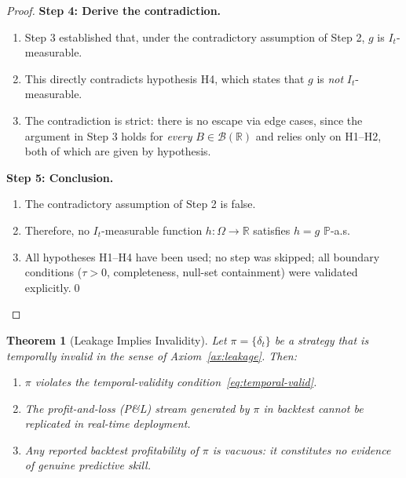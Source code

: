\documentclass[12pt,openany]{book}
\newcommand{\calI}{\mathcal{I}}
\numberwithin{equation}{chapter}
\theoremstyle{plain}
\newtheorem{theorem}{Theorem}[chapter]
\theoremstyle{definition}
\theoremstyle{remark}
\numberwithin{equation}{chapter}
\theoremstyle{plain}
\def\calI{I}%
\begin{document}
\begin{proof}
\medskip
\noindent\textbf{Step 4: Derive the contradiction.}
\begin{enumerate}
  \item Step 3 established that, under the contradictory
        assumption of Step 2, $g$ is $\calI_t$-measurable.
  \item This directly contradicts hypothesis H4, which states
        that $g$ is \emph{not} $\calI_t$-measurable.
  \item The contradiction is strict: there is no escape via
        edge cases, since the argument in Step 3 holds for
        \emph{every} $B \in \mathcal{B}(\mathbb{R})$ and relies
        only on H1--H2, both of which are given by hypothesis.
\end{enumerate}

\medskip
\noindent\textbf{Step 5: Conclusion.}
\begin{enumerate}
  \item The contradictory assumption of Step 2 is false.
  \item Therefore, no $\calI_t$-measurable function
        $h : \Omega \to \mathbb{R}$ satisfies
        $h = g$ $\mathbb{P}$-a.s.
  \item All hypotheses H1--H4 have been used; no step was
        skipped; all boundary conditions ($\tau > 0$,
        completeness, null-set containment) were validated
        explicitly.\qed
\end{enumerate}
\end{proof}

\begin{theorem}[Leakage Implies Invalidity]
\label{thm:leakage-invalidity}
Let $\pi = \{\delta_t\}$ be a strategy that is temporally invalid
in the sense of Axiom~\ref{ax:leakage}.  Then:
\begin{enumerate}
  \item $\pi$ violates the temporal-validity
        condition~\eqref{eq:temporal-valid}.
  \item The profit-and-loss (P\&L) stream generated by $\pi$ in
        backtest \emph{cannot} be replicated in real-time deployment.
  \item Any reported backtest profitability of $\pi$ is
        \emph{vacuous}: it constitutes no evidence of genuine
        predictive skill.
\end{enumerate}
\end{theorem}
\end{document}
